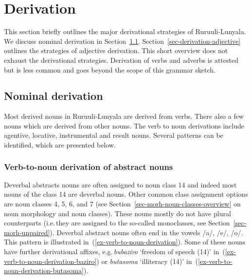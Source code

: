 \section{Derivation}\label{morpho-derivation}

This section briefly outlines the major derivational strategies of Ru\-ruu\-li\hyp{}Lu\-nya\-la. 
We discuss nominal derivation in Section~\ref{sec-derivation-noun}. Section~\ref{sec-derivation-adjective} outlines the strategies of adjective derivation. 
This short overview does not exhaust the derivational strategies. 
Derivation of verbs and adverbs is attested but is less common and goes beyond the scope of this grammar sketch.


\subsection{Nominal derivation}\label{sec-derivation-noun}
Most derived  nouns in Ru\-ruu\-li\hyp{}Lu\-nya\-la are derived from verbs. 
There also a few nouns which are derived from other nouns. 
The verb to noun derivations include agentive, locative, instrumental and result nouns. 
Several patterns can be identified, which are presented below.

\subsubsection{Verb-to-noun derivation of abstract nouns}\label{sec-morphology-derivation-abstract}

Deverbal abstracts nouns are often assigned to noun class 14 and indeed most nouns of the class 14 are deverbal nouns. 
Other common class assignment options are noun classes 4, 5, 6, and 7 (see Section~\ref{sec-morh-noun-classes-overview} on noun morphology and noun classes). 
These nouns mostly do not have plural counterparts (i.e.\,they are assigned to the so-called monoclasses, see Section~\ref{sec-morh-unpaired}). 
Deverbal abstract nouns often end in the vowels /a/, /e/, /o/. 
This pattern is illustrated in~(\ref{ex-verb-to-noun-derivation}). 
Some of these nouns have further derivational affixes,  e.g.\,\textit{bubaziro} `freedom of speech (14)’ in~(\ref{ex-verb-to-noun-derivation-baziro}) or \textit{butasoma} `illiteracy (14)’ in~(\ref{ex-verb-to-noun-derivation-butasoma}).

